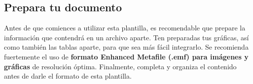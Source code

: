     
    
    \subsection{Prepara tu documento}
    
    Antes de que comiences a utilizar esta plantilla, es recomendable que prepare la información que contendrá en un archivo aparte. 
    Ten preparadas tus gráficas, así como también las tablas aparte, para que sea más fácil integrarlo. 
    Se recomienda fuertemente el uso de \textbf{formato Enhanced Metafile (.emf) para imágenes y gráficas} de resolución óptima. 
    Finalmente, completa y organiza el contenido antes de darle el formato de esta plantilla. 
    
